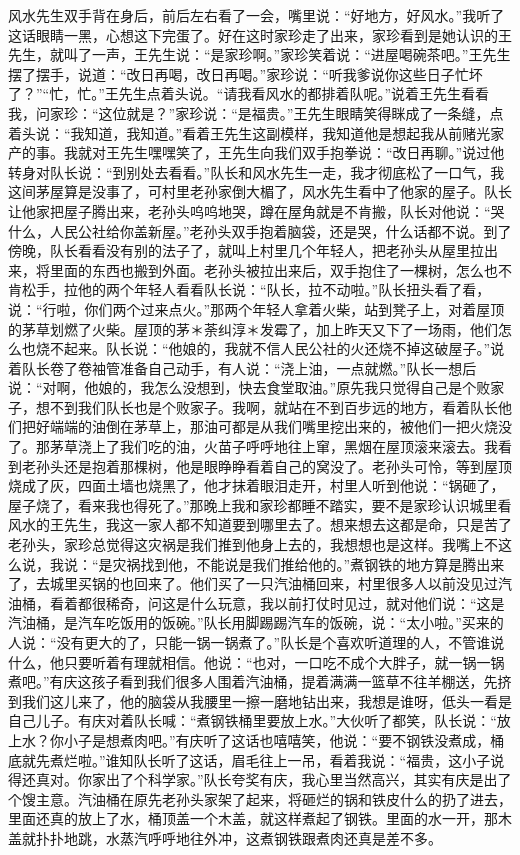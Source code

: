 \documentclass[12pt,UTF8]{ctexbook}
\begin{document}
风水先生双手背在身后，前后左右看了一会，嘴里说：“好地方，好风水。”我听了这话眼睛一黑，心想这下完蛋了。好在这时家珍走了出来，家珍看到是她认识的王先生，就叫了一声，王先生说：“是家珍啊。”家珍笑着说：“进屋喝碗茶吧。”王先生摆了摆手，说道：“改日再喝，改日再喝。”家珍说：“听我爹说你这些日子忙坏了？”“忙，忙。”王先生点着头说。“请我看风水的都排着队呢。”说着王先生看看我，问家珍：“这位就是？”家珍说：“是福贵。”王先生眼睛笑得眯成了一条缝，点着头说：“我知道，我知道。”看着王先生这副模样，我知道他是想起我从前赌光家产的事。我就对王先生嘿嘿笑了，王先生向我们双手抱拳说：“改日再聊。”说过他转身对队长说：“到别处去看看。”队长和风水先生一走，我才彻底松了一口气，我这间茅屋算是没事了，可村里老孙家倒大楣了，风水先生看中了他家的屋子。队长让他家把屋子腾出来，老孙头呜呜地哭，蹲在屋角就是不肯搬，队长对他说：“哭什么，人民公社给你盖新屋。”老孙头双手抱着脑袋，还是哭，什么话都不说。到了傍晚，队长看看没有别的法子了，就叫上村里几个年轻人，把老孙头从屋里拉出来，将里面的东西也搬到外面。老孙头被拉出来后，双手抱住了一棵树，怎么也不肯松手，拉他的两个年轻人看看队长说：“队长，拉不动啦。”队长扭头看了看，说：“行啦，你们两个过来点火。”那两个年轻人拿着火柴，站到凳子上，对着屋顶的茅草划燃了火柴。屋顶的茅＊荼纠淳＊发霉了，加上昨天又下了一场雨，他们怎么也烧不起来。队长说：“他娘的，我就不信人民公社的火还烧不掉这破屋子。”说着队长卷了卷袖管准备自己动手，有人说：“浇上油，一点就燃。”队长一想后说：“对啊，他娘的，我怎么没想到，快去食堂取油。”原先我只觉得自己是个败家子，想不到我们队长也是个败家子。我啊，就站在不到百步远的地方，看着队长他们把好端端的油倒在茅草上，那油可都是从我们嘴里挖出来的，被他们一把火烧没了。那茅草浇上了我们吃的油，火苗子呼呼地往上窜，黑烟在屋顶滚来滚去。我看到老孙头还是抱着那棵树，他是眼睁睁看着自己的窝没了。老孙头可怜，等到屋顶烧成了灰，四面土墙也烧黑了，他才抹着眼泪走开，村里人听到他说：“锅砸了，屋子烧了，看来我也得死了。”那晚上我和家珍都睡不踏实，要不是家珍认识城里看风水的王先生，我这一家人都不知道要到哪里去了。想来想去这都是命，只是苦了老孙头，家珍总觉得这灾祸是我们推到他身上去的，我想想也是这样。我嘴上不这么说，我说：“是灾祸找到他，不能说是我们推给他的。”煮钢铁的地方算是腾出来了，去城里买锅的也回来了。他们买了一只汽油桶回来，村里很多人以前没见过汽油桶，看着都很稀奇，问这是什么玩意，我以前打仗时见过，就对他们说：“这是汽油桶，是汽车吃饭用的饭碗。”队长用脚踢踢汽车的饭碗，说：“太小啦。”买来的人说：“没有更大的了，只能一锅一锅煮了。”队长是个喜欢听道理的人，不管谁说什么，他只要听着有理就相信。他说：“也对，一口吃不成个大胖子，就一锅一锅煮吧。”有庆这孩子看到我们很多人围着汽油桶，提着满满一篮草不往羊棚送，先挤到我们这儿来了，他的脑袋从我腰里一擦一磨地钻出来，我想是谁呀，低头一看是自己儿子。有庆对着队长喊：“煮钢铁桶里要放上水。”大伙听了都笑，队长说：“放上水？你小子是想煮肉吧。”有庆听了这话也嘻嘻笑，他说：“要不钢铁没煮成，桶底就先煮烂啦。”谁知队长听了这话，眉毛往上一吊，看着我说：“福贵，这小子说得还真对。你家出了个科学家。”队长夸奖有庆，我心里当然高兴，其实有庆是出了个馊主意。汽油桶在原先老孙头家架了起来，将砸烂的锅和铁皮什么的扔了进去，里面还真的放上了水，桶顶盖一个木盖，就这样煮起了钢铁。里面的水一开，那木盖就扑扑地跳，水蒸汽呼呼地往外冲，这煮钢铁跟煮肉还真是差不多。
\end{document}
